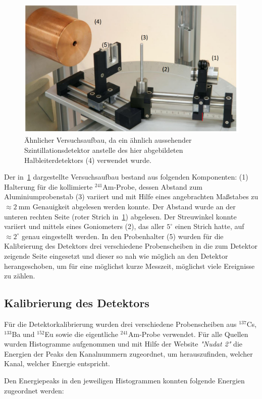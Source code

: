 \documentclass[slug=CS, room=Andreas-Schubert-Bau\,\ Labor\ 406,
supervisor=Juliane\ Volkmer, coursedate=29.\ 11.\ 2019]{../../Lab_Report_LaTeX/lab_report}
\begin{document}
\begin{figure}[H]\centering
	\includegraphics[width=.7\columnwidth]{./pictures/versuchsaufbau.png}
	\caption{Ähnlicher Versuchsaufbau, da ein ähnlich aussehender Szintillationsdetektor anstelle 
		des hier abgebildeten Halbleiterdetektors (4) verwendet wurde.}
	\label{fig:versuchsaufbau}
\end{figure}

Der in~\ref{fig:versuchsaufbau} dargestellte Versuchsaufbau bestand aus folgenden Komponenten:
(1) Halterung für die kollimierte \(^{241}\)Am-Probe, dessen Abstand zum Aluminiumprobenstab (3)
variiert und mit Hilfe eines angebrachten Maßstabes zu \(\approx \SI{2}{\milli\metre}\)
Genauigkeit abgelesen werden konnte. Der Abstand wurde an der unteren rechten Seite (roter Strich
in~\ref{fig:versuchsaufbau}) abgelesen. Der Streuwinkel konnte variiert und mittels eines
Goniometers (2), das aller \(5^\circ\) einen Strich hatte, auf \(\approx 2^\circ\) genau
eingestellt werden. In den Probenhalter (5) wurden für die Kalibrierung des Detektors drei
verschiedene Probenscheiben in die zum Detektor zeigende Seite eingesetzt und dieser so nah wie
möglich an den Detektor herangeschoben, um für eine möglichst kurze Messzeit, möglichst viele Ereignisse zu zählen.

\subsection{Kalibrierung des Detektors}
\label{sec:kalib}

Für die Detektorkalibrierung wurden drei verschiedene Probenscheiben aus \(^{137}\)Cs, 
\(^{133}\)Ba und \(^{152}\)Eu sowie die eigentliche \(^{241}\)Am-Probe verwendet.
Für alle Quellen wurden Histogramme aufgenommen und mit Hilfe der Website \emph{"Nudat 2"}
die Energien der Peaks den Kanalnummern zugeordnet, um herauszufinden, welcher Kanal, welcher
Energie entspricht.

Den Energiepeaks in den jeweiligen Histogrammen konnten folgende Energien zugeordnet werden:
\end{document}

